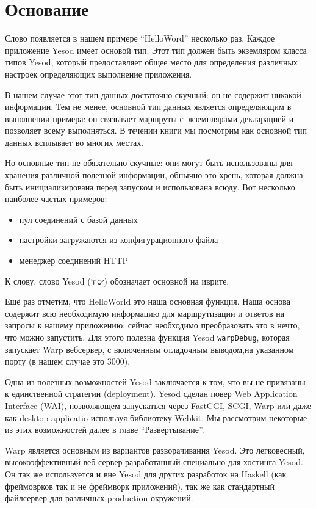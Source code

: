 \section{Основание}

Слово появляется в нашем примере ``HelloWord'' несколько раз. Каждое приложение 
Yesod имеет основой тип. Этот тип должен быть экземляром класса типов Yesod, 
который предоставляет общее место для определения различных настроек определяющих 
выполнение приложения.

В нашем случае этот тип данных достаточно скучный: он не содержит никакой информации. 
Тем не менее, основной тип данных является определяющим в выполнении примера: 
он связывает маршруты с экземплярами декларацией и позволяет всему выполняться. 
В течении книги мы посмотрим как основной тип данных всплывает во многих местах.

Но основные тип не обязательно скучные: они могут быть использованы для 
хранения различной полезной
информации, обнычно это хрень, которая должна быть инициализирована перед запуском и 
использована всюду. Вот несколько наиболее частых примеров:

\begin{itemize}
  \item пул соединений с базой данных
  \item настройки загружаются из конфигурационного файла
  \item менеджер соединений HTTP
\end{itemize}

К слову, слово Yesod (יסוד) обозначает основной на иврите.


Ещё раз отметим, что HelloWorld это наша основная функция. Наша основа содержит всю
необходимую информацию для маршрутизации и ответов на запросы к нашему приложению;
сейчас необходимо преобразовать это в нечто, что можно запустить. Для этого полезна
функция Yesod \lstinline'warpDebug', которая запускает Warp вебсервер, с включенным отладочным
выводом,на указанном порту (в нашем случае это 3000).

Одна из полезных возможностей Yesod заключается к том, что вы не привязаны к единственной
стратегии (deployment). Yesod сделан повер Web Application Interface (WAI), позволяющем
запускаться через FastCGI, SCGI, Warp или даже как desktop applicatio используя библиотеку
Webkit. Мы рассмотрим некоторые из этих возможностей далее в главе ``Развертывание''.

Warp является основным из вариантов разворачивания Yesod. Это легковесный, высокоэффективный
веб сервер разработанный специально для хостинга Yesod. Он так же используется и вне Yesod
для других разработок на Haskell (как фреймоврков так и не фреймворк приложений), так же 
как стандартный файлсервер для различных production окружений.


